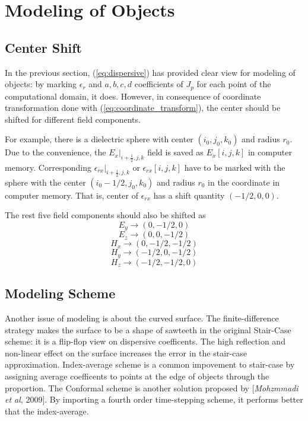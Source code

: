 \section{Modeling of Objects}
\label{sec:modeling}

\subsection{Center Shift}
In the previous section, (\ref{eq:dispersive}) has provided clear view for modeling of objects: by marking $\epsilon_r$
and $a, b, c,d$ coefficients of $J_p$ for each point of the computational domain, it does. However, in consequence of
coordinate transformation done with (\ref{eq:coordinate_transform}), the center should be shifted for different
field components.

For example, there is a dielectric sphere with center $(i_0,j_0,k_0)$ and radius $r_0$. Due to the convenience, the
$E_x|_{i+\frac{1}{2},j,k}$ field is saved as $E_x[i,j,k]$ in computer memory. Corresponding
$\epsilon_{rx}|_{i+\frac{1}{2},j,k}$ or $\epsilon_{rx}[i,j,k]$ have to be marked with the sphere with the center $(i_0-1/2,
j_0, k_0)$ and radius $r_0$ in the coordinate in computer memory. That is, center of $\epsilon_{rx}$ has a shift
quantity $(-1/2,0,0)$.

The rest five field components should also be shifted as 
\begin{displaymath}
  E_y \rightarrow (0,-1/2,0)
\end{displaymath}
\begin{displaymath}
  E_z \rightarrow (0,0,-1/2)
\end{displaymath}
\begin{displaymath}
  H_x \rightarrow (0,-1/2,-1/2)
\end{displaymath}
\begin{displaymath}
  H_y \rightarrow (-1/2,0,-1/2)
\end{displaymath}
\begin{displaymath}
  H_z \rightarrow (-1/2,-1/2,0)
\end{displaymath}

\subsection{Modeling Scheme}
Another issue of modeling is about the curved surface. The finite-difference strategy makes the surface to be a shape of
sawteeth in the original Stair-Case scheme: it is a flip-flop view on dispersive coefficents. The high reflection and
non-linear effect on the surface increases the error in the stair-case approximation. Index-average scheme is a common
impovement to stair-case by assigning average coefficents to points at the edge of objects through the proportion. The
Conformal scheme is another solution proposed by [\textit{Mohzmmadi et al}, 2009]. By importing a fourth order
time-stepping scheme, it performs better that the index-average.

